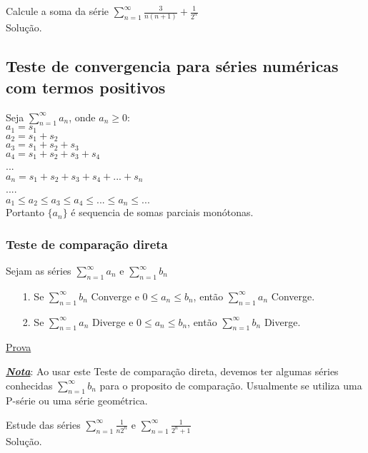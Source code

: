 \begin{ex}
	Calcule a soma da série $\sum_{n=1}^{\infty}\frac{3}{n(n+1)}+\frac{1}{2^{n}}$ \\
	Solução.
\end{ex}
\subsection{Teste de convergencia para séries numéricas com termos positivos}
Seja $\sum_{n=1}^{\infty}a_{n}$, onde $a_{n}\geq 0$:\\
$a_{1}=s_{1}$\\
$a_{2}=s_{1}+s_{2}$\\
$a_{3}=s_{1}+s_{2}+s_{3}$\\
$a_{4}=s_{1}+s_{2}+s_{3}+s_{4}$\\
...\\
$a_{n}=s_{1}+s_{2}+s_{3}+s_{4}+...+s_{n}$\\
....\\

$a_{1}\leq a_{2}\leq a_{3} \leq a_{4}\leq ...\leq a_{n}\leq...$\\

Portanto $\{a_{n}\}$ é sequencia de somas parciais monótonas.
\subsubsection{Teste de comparação direta}
Sejam as séries $\sum_{n=1}^{\infty}a_{n}$ e $\sum_{n=1}^{\infty}b_{n}$\\
\begin{itemize}
	\item[1.] Se $\sum_{n=1}^{\infty}b_{n}$ Converge e $0\leq a_{n}\leq b_{n}$, então $\sum_{n=1}^{\infty}a_{n}$ Converge.
	
	\item[2.]Se $\sum_{n=1}^{\infty}a_{n}$ Diverge e $0\leq a_{n}\leq b_{n}$, então $\sum_{n=1}^{\infty}b_{n}$ Diverge.
\end{itemize}
\underline{Prova}\\
\vspace*{5cm}

\textbf{\textit{\underline{Nota}}}: Ao usar este Teste de comparação direta, devemos  ter algumas séries conhecidas $\sum_{n=1}^{\infty}b_{n}$ para o proposito de comparação. Usualmente se utiliza uma P-série ou uma série geométrica.

\begin{ex}
	Estude das séries $\sum_{n=1}^{\infty}\frac{1}{n2^{n}}$ e  $\sum_{n=1}^{\infty}\frac{1}{2^{n}+1}$\\
	Solução.
\end{ex}
\vspace*{5cm}
